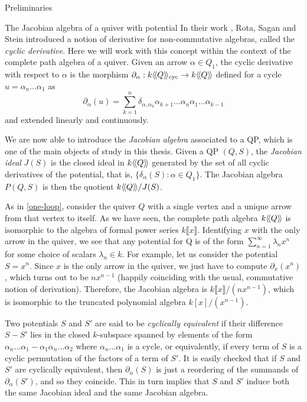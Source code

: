 \begin{chapter}{Preliminaries}
\begin{section}{The Jacobian algebra of a quiver with potential}
In their work \cite{RSS80}, Rota, Sagan and Stein introduced a notion of derivative for non-commutative algebras, called the \emph{cyclic derivative}. Here we will work with this concept within the context of the complete path algebra of a quiver. Given an arrow $\alpha\in Q_1$, the cyclic derivative with respect to $\alpha$ is the morphism $\partial_\alpha:k\langle\!\langle Q\rangle\!\rangle_{\mathrm{cyc}}\to k\langle\!\langle Q\rangle\!\rangle$ defined for a cycle $u=\alpha_n\dots\alpha_1$ as
\[
\partial_\alpha(u) = \sum_{k=1}^n \delta_{\alpha, \alpha_k}\alpha_{k+1}\dots\alpha_n\alpha_1\dots\alpha_{k-1}
\]
and extended linearly and continuously.

We are now able to introduce the \emph{Jacobian algebra} associated to a QP, which is one of the main objects of study in this thesis. Given a QP $(Q,S)$, the \emph{Jacobian ideal} $J(S)$ is the closed ideal in $k\langle\!\langle Q\rangle\!\rangle$ generated by the set of all cyclic derivatives of the potential, that is, $\{\delta_\alpha(S) : \alpha\in Q_1\}$. The Jacobian algebra $P(Q,S)$ is then the quotient $k\langle\!\langle Q\rangle\!\rangle/J(S)$.

\begin{exmp} As in \ref{one-loop}, consider the quiver $Q$ with a single vertex and a unique arrow from that vertex to itself. As we have seen, the complete path algebra $k\langle\!\langle Q\rangle\!\rangle$ is isomorphic to the algebra of formal power series $k\llbracket x\rrbracket$. Identifying $x$ with the only arrow in the quiver, we see that any potential for Q is of the form $\sum_{n=1}^\infty \lambda_n x^n$ for some choice of scalars $\lambda_n\in k$. For example, let us consider the potential $S=x^n$. Since $x$ is the only arrow in the quiver, we just have to compute $\partial_x(x^n)$, which turns out to be $nx^{n-1}$ (happily coinciding with the usual, commutative notion of derivation). Therefore, the Jacobian algebra is $k\llbracket x\rrbracket/(nx^{n-1})$, which is isomorphic to the truncated polynomial algebra $k[x]/(x^{n-1})$.
\end{exmp}

Two potentials $S$ and $S'$ are said to be \emph{cyclically equivalent} if their difference $S-S'$ lies in the closed $k$-subspace spanned by elements of the form $\alpha_n\dots\alpha_1 - \alpha_1\alpha_n\dots\alpha_2$ where $\alpha_n\dots\alpha_1$ is a cycle, or equivalently, if every term of $S$ is a cyclic permutation of the factors of a term of $S'$. It is easily checked that if $S$ and $S'$ are cyclically equivalent, then $\partial_\alpha(S)$ is just a reordering of the summands of $\partial_\alpha(S')$, and so they coincide. This in turn implies that $S$ and $S'$ induce both the same Jacobian ideal and the same Jacobian algebra.


\end{section}
\end{chapter}
